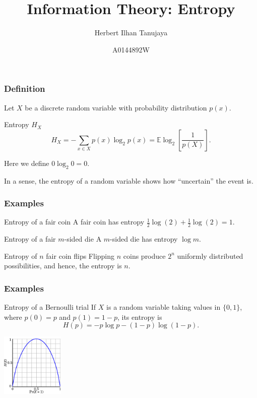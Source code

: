 \documentclass{beamer}
\title{Information Theory: Entropy}
\author{Herbert Ilhan Tanujaya}
\date{A0144892W}
\newcommand{\ls}{\left[}
\newcommand{\rs}{\right]}
\begin{document}
\begin{frame}
  \titlepage
\end{frame}

\begin{frame}
  \frametitle{Definition}
  Let $X$ be a discrete random variable with probability distribution $p(x)$.
  \begin{block}{Entropy $H_X$}
    \[ H_X = - \sum_{x \in X} p(x) \log_2 p(x) = \mathbb{E} \log_2 \ls \frac{1}{p(X)} \rs. \]
  \end{block}
  Here we define $0 \log_2 0 = 0$.

  In a sense, the entropy of a random variable shows how ``uncertain'' the event is.
\end{frame}

\begin{frame}
  \frametitle{Examples}
  \begin{exampleblock}{Entropy of a fair coin}
    A fair coin has entropy $\frac{1}{2} \log(2) + \frac{1}{2} \log(2) = 1$.
  \end{exampleblock} \pause

  \begin{exampleblock}{Entropy of a fair $m$-sided die}
    A $m$-sided die has entropy $\log m$.
  \end{exampleblock} \pause

  \begin{exampleblock}{Entropy of $n$ fair coin flips}
    Flipping $n$ coins produce $2^n$ uniformly distributed possibilities, and hence, the entropy is $n$.
  \end{exampleblock}
\end{frame}

\begin{frame}
  \frametitle{Examples}

  \begin{exampleblock}{Entropy of a Bernoulli trial}
    If $X$ is a random variable taking values in $\{ 0, 1 \}$, where $p(0) = p$ and $p(1) = 1 - p$, its entropy is \[ H(p) = -p \log p - (1 - p) \log (1 - p). \]

    \begin{center}
      \includegraphics[width=3cm]{bernoulli.png}
    \end{center}
  \end{exampleblock}
\end{frame}
\end{document}
